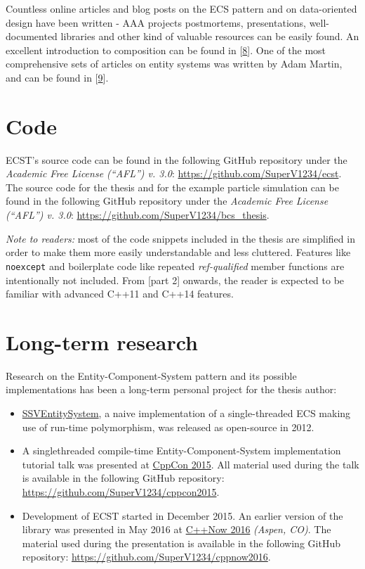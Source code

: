 \documentclass[twoside, 12pt, a4paper, openany]{book}
\begin{document}
Countless online articles and blog posts on the ECS pattern and on
data-oriented design have been written - AAA projects postmortems,
presentations, well-documented libraries and other kind of valuable
resources can be easily found. An excellent introduction to composition
can be found in
{[}\protect\hyperlink{ref-robertnystorm_gpp_component}{8}{]}. One of the
most comprehensive sets of articles on entity systems was written by
Adam Martin, and can be found in
{[}\protect\hyperlink{ref-tmachine_es_category}{9}{]}.

\section{Code}\label{code}

ECST's source code can be found in the following GitHub repository under
the \emph{Academic Free License (``AFL'') v. 3.0}:
\url{https://github.com/SuperV1234/ecst}. The source code for the thesis
and for the example particle simulation can be found in the following
GitHub repository under the \emph{Academic Free License (``AFL'') v.
3.0}: \url{https://github.com/SuperV1234/bcs_thesis}.

\emph{Note to readers:} most of the code snippets included in the thesis
are simplified in order to make them more easily understandable and less
cluttered. Features like
\texttt{noexcept}
and boilerplate code like repeated \emph{ref-qualified} member functions
are intentionally not included. From {[}part 2{]} onwards, the reader is
expected to be familiar with advanced C++11 and C++14 features.

\section{Long-term research}\label{long-term-research}

Research on the Entity-Component-System pattern and its possible
implementations has been a long-term personal project for the thesis
author:

\begin{itemize}
\item
  \href{https://github.com/SuperV1234/SSVEntitySystem}{SSVEntitySystem},
  a naive implementation of a single-threaded ECS making use of run-time
  polymorphism, was released as open-source in 2012.
\item
  A singlethreaded compile-time Entity-Component-System implementation
  tutorial talk was presented at \href{http://cppcon.org}{CppCon 2015}.
  All material used during the talk is available in the following GitHub
  repository: \url{https://github.com/SuperV1234/cppcon2015}.
\item
  Development of ECST started in December 2015. An earlier version of
  the library was presented in May 2016 at
  \href{http://cppnow.org}{C++Now 2016} \emph{(Aspen, CO)}. The material
  used during the presentation is available in the following GitHub
  repository: \url{https://github.com/SuperV1234/cppnow2016}.
\end{itemize}
\end{document}
